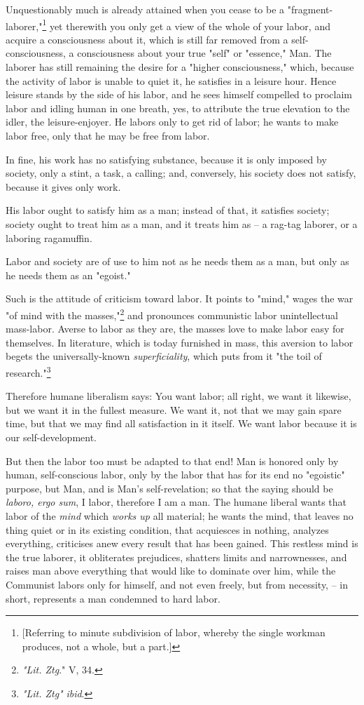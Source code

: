 Unquestionably much is already attained when you cease to be a 
"{}fragment-laborer,"{}\footnote{[Referring to minute subdivision of labor, 
whereby the single workman produces, not a whole, but a part.]} yet therewith 
you only get a view of the whole of your labor, and acquire a consciousness 
about it, which is still far removed from a self-consciousness, a 
consciousness about your true "{}self"{} or "{}essence,"{} Man. The laborer 
has still remaining the desire for a "{}higher consciousness,"{} which, 
because the activity of labor is unable to quiet it, he satisfies in a leisure 
hour. Hence leisure stands by the side of his labor, and he sees himself 
compelled to proclaim labor and idling human in one breath, yes, to attribute 
the true elevation to the idler, the leisure-enjoyer. He labors only to get 
rid of labor; he wants to make labor free, only that he may be free from 
labor.

In fine, his work has no satisfying substance, because it is only imposed by 
society, only a stint, a task, a calling; and, conversely, his society does 
not satisfy, because it gives only work.

His labor ought to satisfy him as a man; instead of that, it satisfies 
society; society ought to treat him as a man, and it treats him as -- a 
rag-tag laborer, or a laboring ragamuffin.

Labor and society are of use to him not as he needs them as a man, but only as 
he needs them as an "{}egoist."{}

Such is the attitude of criticism toward labor. It points to "{}mind,"{} wages 
the war "{}of mind with the masses,"{}\footnote{\textit{"{}Lit. Ztg}."{} V, 
34.} and pronounces communistic labor unintellectual mass-labor. Averse to 
labor as they are, the masses love to make labor easy for themselves. In 
literature, which is today furnished in mass, this aversion to labor begets 
the universally-known \textit{superficiality}, which puts from it "{}the toil 
of research."{}\footnote{\textit{"{}Lit. Ztg"{}} \textit{ibid}.}

Therefore humane liberalism says: You want labor; all right, we want it 
likewise, but we want it in the fullest measure. We want it, not that we may 
gain spare time, but that we may find all satisfaction in it itself. We want 
labor because it is our self-development.

But then the labor too must be adapted to that end! Man is honored only by 
human, self-conscious labor, only by the labor that has for its end no 
"{}egoistic"{} purpose, but Man, and is Man's self-revelation; so that the 
saying should be \textit{laboro, ergo sum}, I labor, therefore I am a man. The 
humane liberal wants that labor of the \textit{mind} which \textit{works up} 
all material; he wants the mind, that leaves no thing quiet or in its existing 
condition, that acquiesces in nothing, analyzes everything, criticises anew 
every result that has been gained. This restless mind is the true laborer, it 
obliterates prejudices, shatters limits and narrownesses, and raises man above 
everything that would like to dominate over him, while the Communist labors 
only for himself, and not even freely, but from necessity, -- in short, 
represents a man condemned to hard labor.

